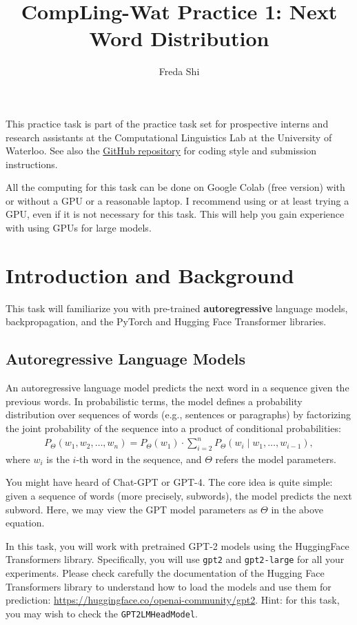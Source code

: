\documentclass[12pt, letterpaper]{article}
\begin{document}
\title{CompLing-Wat Practice 1: Next Word Distribution}
\author{Freda Shi}
\maketitle

This practice task is part of the practice task set for prospective interns and research assistants at the Computational Linguistics Lab at the University of Waterloo.
See also the \href{https://github.com/compling-wat/ura-practice}{GitHub repository} for coding style and submission instructions.

All the computing for this task can be done on Google Colab (free version) with or without a GPU or a reasonable laptop.
I recommend using or at least trying a GPU, even if it is not necessary for this task.
This will help you gain experience with using GPUs for large models.

\section{Introduction and Background}
This task will familiarize you with pre-trained \textbf{autoregressive} language models, backpropagation, and the PyTorch and Hugging Face Transformer libraries.
\subsection{Autoregressive Language Models}
An autoregressive language model predicts the next word in a sequence given the previous words.
In probabilistic terms, the model defines a probability distribution over sequences of words (e.g., sentences or paragraphs) by factorizing the joint probability of the sequence into a product of conditional probabilities:
\begin{align*}
    P_\Theta(w_1, w_2, \ldots, w_n) = P_\Theta(w_1) \cdot \sum_{i=2}^n P_\Theta(w_i \mid w_1, \ldots, w_{i-1}),
\end{align*}
where $w_i$ is the $i$-th word in the sequence, and $\Theta$ refers the model parameters.

You might have heard of Chat-GPT or GPT-4.
The core idea is quite simple: given a sequence of words (more precisely, subwords), the model predicts the next subword.
Here, we may view the GPT model parameters as $\Theta$ in the above equation.

In this task, you will work with pretrained GPT-2 models using the HuggingFace Transformers library.
Specifically, you will use \texttt{gpt2} and \texttt{gpt2-large} for all your experiments.
Please check carefully the documentation of the Hugging Face Transformers library to understand how to load the models and use them for prediction: \url{https://huggingface.co/openai-community/gpt2}.
Hint: for this task, you may wish to check the \texttt{GPT2LMHeadModel}.
\end{document}
